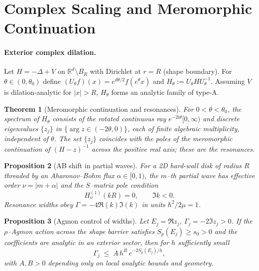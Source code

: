 \documentclass[11pt]{article}
\newtheorem{theorem}{Theorem}[section]
\newtheorem{proposition}[theorem]{Proposition}
\theoremstyle{definition}
\begin{document}
    \section{Complex Scaling and Meromorphic Continuation}
    \label{app:complex-scaling}
    
    \paragraph{Exterior complex dilation.}
    Let $H=-\Delta+V$ on $\mathbb{R}^d\setminus \overline{B_R}$ with Dirichlet at $r=R$ (shape boundary).
    For $\theta\in(0,\theta_0)$ define $(U_\theta f)(x)=e^{d\theta/2}f(e^{\theta}x)$ and $H_\theta:=U_\theta H U_\theta^{-1}$.
    Assuming $V$ is dilation-analytic for $|x|>R$, $H_\theta$ forms an analytic family of type-A.
    
    \begin{theorem}[Meromorphic continuation and resonances]\label{thm:C-balslev-combes}
    	For $0<\theta<\theta_0$, the spectrum of $H_\theta$ consists of the rotated continuous ray $e^{-2\mathrm{i}\theta}[0,\infty)$ and discrete eigenvalues $\{z_j\}$ in $\{\arg z\in(-2\theta,0)\}$, each of finite algebraic multiplicity, independent of $\theta$.
    	The set $\{z_j\}$ coincides with the poles of the meromorphic continuation of $(H-z)^{-1}$ across the positive real axis; these are the \emph{resonances}.
    \end{theorem}
    
    \begin{proposition}[AB shift in partial waves]\label{prop:C-AB}
    	For a 2D hard-wall disk of radius $R$ threaded by an Aharonov--Bohm flux $\alpha\in[0,1)$, the $m$–th partial wave has effective order $\nu=|m+\alpha|$ and the $S$–matrix pole condition
    	\[
    	H^{(1)}_{\nu}(kR)=0,\qquad \Im k<0.
    	\]
    	Resonance widths obey $\Gamma=-4\Re(k)\Im(k)$ in units $\hbar^2/2\mu=1$.
    \end{proposition}
    
    \begin{proposition}[Agmon control of widths]\label{prop:C-width}
    	Let $E_j=\Re z_j$, $\Gamma_j=-2\Im z_j>0$.
    	If the $\rho$–Agmon action across the shape barrier satisfies $S_p(E_j)\ge s_0>0$ and the coefficients are analytic in an exterior sector, then for $h$ sufficiently small
    	\[
    	\Gamma_j \;\le\; A\,h^{B}\,e^{-2S_p(E_j)/h},
    	\]
    	with $A,B>0$ depending only on local analytic bounds and geometry. 
    \end{proposition}
    
\end{document}
